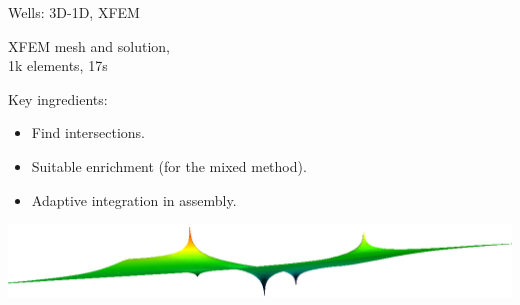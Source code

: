 \documentclass[10pt]{beamer} %
\begin{document}
\begin{frame}{Wells: 3D-1D, XFEM}
\begin{minipage}{0.4\linewidth}
         \centering            
         {\footnotesize XFEM mesh and solution,\\ 1k elements, 17s}
     \end{minipage}

 Key ingredients:
 \begin{itemize}
    \item Find intersections.
    \item Suitable enrichment (for the mixed method).
    \item Adaptive integration in assembly.
  \end{itemize}  
  \vspace{-1ex}
  \hfill\hbox{\includegraphics[width=0.7\linewidth]{graphics/warp_five_wells_alpha.png}}
\end{frame}
\end{document}
